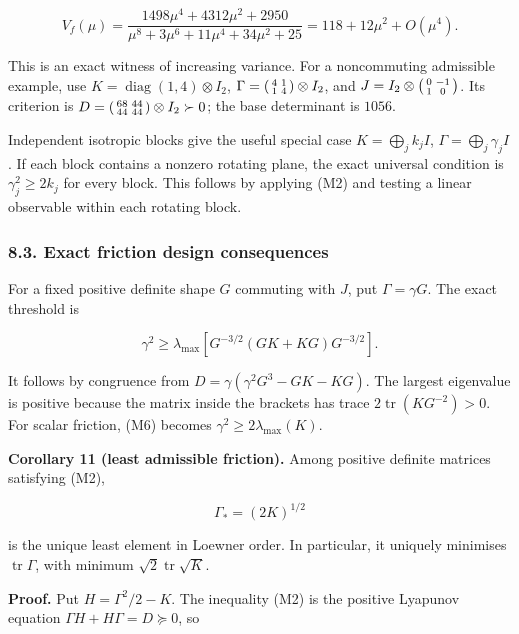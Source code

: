 \documentclass[
  british,
  11pt,
  a4paper,
]{article}
\begin{document}
\[
V_f(\mu)=
\frac{1498\mu^4+4312\mu^2+2950}
{\mu^8+3\mu^6+11\mu^4+34\mu^2+25}
=118+12\mu^2+O(\mu^4).
\]

This is an exact witness of increasing variance. For a noncommuting
admissible example, use \(K=\mathop{\mathrm{diag}}(1,4)\otimes I_2\),
\(\Gamma=\begin{psmallmatrix}4&1\\1&4\end{psmallmatrix}\otimes I_2\),
and \(J=I_2\otimes\begin{psmallmatrix}0&-1\\1&0\end{psmallmatrix}\). Its
criterion is
\(D=\begin{psmallmatrix}68&44\\44&44\end{psmallmatrix}\otimes I_2\succ0\);
the base determinant is \(1056\).

Independent isotropic blocks give the useful special case
\(K=\bigoplus_jk_jI\), \(\Gamma=\bigoplus_j\gamma_jI\). If each block
contains a nonzero rotating plane, the exact universal condition is
\(\gamma_j^2\ge2k_j\) for every block. This follows by applying (M2) and
testing a linear observable within each rotating block.

\subsubsection{8.3. Exact friction design
consequences}\label{exact-friction-design-consequences}

For a fixed positive definite shape \(G\) commuting with \(J\), put
\(\Gamma=\gamma G\). The exact threshold is

\[
\gamma^2\ge\lambda_{\max}
\left[G^{-3/2}(GK+KG)G^{-3/2}\right]. \tag{M6}
\]

It follows by congruence from \(D=\gamma(\gamma^2G^3-GK-KG)\). The
largest eigenvalue is positive because the matrix inside the brackets
has trace \(2\operatorname{tr}(KG^{-2})>0\). For scalar friction, (M6)
becomes \(\gamma^2\ge2\lambda_{\max}(K)\).

\textbf{Corollary 11 (least admissible friction).} Among positive
definite matrices satisfying (M2),

\[
\Gamma_*=(2K)^{1/2}
\]

is the unique least element in Loewner order. In particular, it uniquely
minimises \(\operatorname{tr}\Gamma\), with minimum
\(\sqrt2\operatorname{tr}\sqrt K\).

\textbf{Proof.} Put \(H=\Gamma^2/2-K\). The inequality (M2) is the
positive Lyapunov equation \(\Gamma H+H\Gamma=D\succeq0\), so
\end{document}
